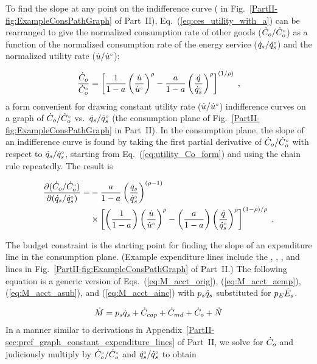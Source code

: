 \documentclass[12pt]{article}\usepackage[]{graphicx}\usepackage[]{xcolor}
\begin{document}
To find the slope at any point on the indifference curve 
(\iicirc{} in Fig.~\ref{PartII-fig:ExampleConsPathGraph} of Part~II),
Eq.~(\ref{eq:ces_utility_with_a}) can be rearranged to give 
the normalized consumption rate of other goods ($\dot{C}_o/{}{\dot{C}}^{\scriptscriptstyle \circ}_o$)
as a function of the normalized consumption rate of the energy service
($\dot{q}_s/{}{\dot{q}}^{\scriptscriptstyle \circ}_s$)
and the normalized utility rate ($\dot{u}/{}{\dot{u}}^{\scriptscriptstyle \circ}$):

\begin{equation} \label{eq:utility_Co_form}
  \frac{\dot{C}_o}{{}{\dot{C}}^{\scriptscriptstyle \circ}_o} = 
      \left[ \frac{1}{1 - a} \left( \frac{\dot{u}}{{}{\dot{u}}^{\scriptscriptstyle \circ}} \right)^\rho 
            - \frac{a}{1 - a} \left( \frac{\dot{q}}{{}{\dot{q}}^{\scriptscriptstyle \circ}_s} \right)^\rho \right]^{(1/\rho)} \; ,
\end{equation}
%
a form convenient for drawing 
constant utility rate ($\dot{u}/{}{\dot{u}}^{\scriptscriptstyle \circ}$) indifference curves on a graph of
$\dot{C}_o/{}{\dot{C}}^{\scriptscriptstyle \circ}_o$ vs.\ 
$\dot{q}_s/{}{\dot{q}}^{\scriptscriptstyle \circ}_s$ 
(the consumption plane of
Fig.~\ref{PartII-fig:ExampleConsPathGraph} in Part~II).
In the consumption plane, 
the slope of an indifference curve is found by taking the first 
partial derivative of $\dot{C}_o/{}{\dot{C}}^{\scriptscriptstyle \circ}_o$
with respect to $\dot{q}_s/{}{\dot{q}}^{\scriptscriptstyle \circ}_s$,
starting from Eq.~(\ref{eq:utility_Co_form}) and 
using the chain rule repeatedly.
The result is

\begin{align} \label{eq:slope_indifference_curve}
  \frac{\partial (\dot{C}_o/{}{\dot{C}}^{\scriptscriptstyle \circ}_o)}{\partial (\dot{q}_s/{}{\dot{q}}^{\scriptscriptstyle \circ}_s)} =&
        -\frac{a}{1 - a} \left( \frac{\dot{q}_s}{{}{\dot{q}}^{\scriptscriptstyle \circ}_s} \right)^{(\rho -1)} \nonumber  \\
        &\times \left[ \left( \frac{1}{1 - a} \right) \left( \frac{\dot{u}}{{}{\dot{u}}^{\scriptscriptstyle \circ}} \right)^\rho
                - \left( \frac{a}{1 - a} \right) 
                          \left( \frac{\dot{q}}{{}{\dot{q}}^{\scriptscriptstyle \circ}_s} \right)^\rho \right]^{(1 - \rho)/\rho} \; .
\end{align}

The budget constraint is the starting point for finding 
the slope of an expenditure line in the consumption plane.
(Example expenditure lines include
the \circcirc{}, \starstar{}, \hathat{}, and \barbar{} lines
in Fig.~\ref{PartII-fig:ExampleConsPathGraph} of Part~II.)
The following equation is a generic version of Eqs.~(\ref{eq:M_acct_orig}), 
(\ref{eq:M_acct_aemp}), 
(\ref{eq:M_acct_asub}), and 
(\ref{eq:M_acct_ainc})
with $p_s \dot{q}_s$ substituted for $p_E \dot{E}_s$.

\begin{equation}
  \dot{M} = p_s \dot{q}_s + \dot{C}_{cap} + \dot{C}_{md} + \dot{C}_o  + \dot{N}
\end{equation}
%
In a manner similar to derivations in
Appendix~\ref{PartII-sec:pref_graph_constant_expenditure_lines} of Part~II,
we solve for $\dot{C}_o$ and 
judiciously multiply by ${}{\dot{C}}^{\scriptscriptstyle \circ}_o/{}{\dot{C}}^{\scriptscriptstyle \circ}_o$
and ${}{\dot{q}}^{\scriptscriptstyle \circ}_s/{}{\dot{q}}^{\scriptscriptstyle \circ}_s$ to obtain
\end{document}
